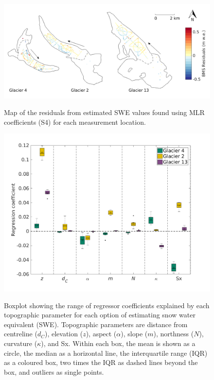 \documentclass{sfuthesis}
\newcommand{\params}{Topographic parameters are distance from centreline ($d_C$), elevation ($z$), aspect ($\alpha$), slope ($m$), northness ($N$), curvature ($\kappa$), and Sx. }
\newcommand{\boxplot}{Within each box, the mean is shown as a circle, the median as a horizontal line, the interquartile range (IQR) as a coloured box, two times the IQR as dashed lines beyond the box, and outliers as single points. }
\begin{document}
\begin{figure}[H]
	\centering
	\includegraphics[width =\textwidth]{residualsMap_MLR.png}\\
	\caption{Map of the residuals from estimated SWE values found using MLR coefficients (S4) for each measurement location.}
	\label{fig:MLR_residualsMap}
\end{figure} 

\begin{figure}
	\centering
	\includegraphics[width =1.1 \textwidth]{MLRcoeff_DensityOpts.png}\\
	\caption{Boxplot showing the range of regressor coefficients explained by each topographic parameter for each option of estimating snow water equivalent (SWE). \params \boxplot }
	\label{fig:MLRcoeff_densityOptions}
\end{figure}
\end{document}
